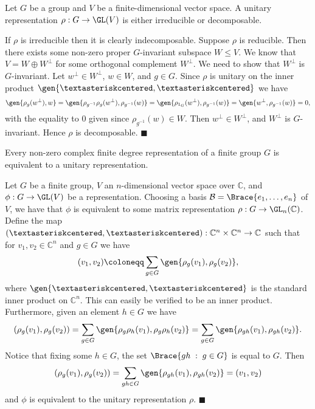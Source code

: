 \documentclass[../Project.tex]{subfiles}
\begin{document}
\begin{prop}[{\cite[Proposition 3.2.3]{1}}]
	Let $G$ be a group and $V$ be a finite-dimensional vector space. A unitary representation $\rho : G \to \GL(V)$ is either irreducible or decomposable.
	\label{unitaryiseither}
\end{prop}
\begin{proo*}[{\cite[Proposition 3.2.3]{1}}]
	If $\rho$ is irreducible then it is clearly indecomposable. Suppose $\rho$ is reducible. Then there exists some non-zero proper $G$-invariant subspace $W \leqslant V$. We know that $V = W \oplus W^\perp$ for some orthogonal complement $W^\perp$. We need to show that $W^\perp$ is $G$-invariant. Let $w^\perp \in W^\perp$, $w \in W$, and $g \in G$. Since $\rho$ is unitary on the inner product $\gen{\textasteriskcentered,\textasteriskcentered}$ we have
	$$\gen{\rho_g(w^\perp),w} = \gen{\rho_{g^{-1}}\rho_{g}(w^\perp),\rho_{g^{-1}}(w)} = \gen{\rho_{1_G}(w^\perp),\rho_{g^{-1}}(w)} = \gen{w^\perp,\rho_{g^{-1}}(w)} = 0,$$
	with the equality to $0$ given since $\rho_{g^{-1}}(w) \in W$. Then $w^\perp \in W^\perp$, and $W^{\perp}$ is $G$-invariant. Hence $\rho$ is decomposable. \hfill$\blacksquare$
\end{proo*}

\begin{prop}[{\cite[Proposition 3.2.4]{1}}]
	Every non-zero complex finite degree representation of a finite group $G$ is equivalent to a unitary representation.
	\label{unitaryeqtofinite}
\end{prop}
\begin{proo*}[{\cite[Proposition 3.2.4]{1}}]
	Let $G$ be a finite group, $V$ an $n$-dimensional vector space over $\mathbb{C}$, and $\phi : G \to \GL(V)$ be a representation. Choosing a basis $\mathcal{B} = \Brace{e_1,\dots,e_n}$ of $V$, we have that $\phi$ is equivalent to some matrix representation $\rho : G \to \GL_n(\mathbb{C})$. Define the map $(\textasteriskcentered,\textasteriskcentered) : \mathbb{C}^n \times \mathbb{C}^n \to \mathbb{C}$ such that for $v_1,v_2 \in \mathbb{C}^n$ and $g \in G$ we have
	$$(v_1,v_2) \coloneqq \sum_{g\in G}\gen{\rho_g(v_1),\rho_g(v_2)},$$
	where $\gen{\textasteriskcentered,\textasteriskcentered}$ is the standard inner product on $\mathbb{C}^n$. This can easily be verified to be an inner product. Furthermore, given an element $h \in G$ we have
	$$(\rho_g(v_1),\rho_g(v_2)) = \sum_{g \in G}\gen{\rho_g\rho_h(v_1),\rho_g\rho_h(v_2)} = \sum_{g \in G}\gen{\rho_{gh}(v_1),\rho_{gh}(v_2)}.$$
	Notice that fixing some $h \in G$, the set $\Brace{gh\;:\;g \in G}$ is equal to $G$. Then
	$$(\rho_g(v_1),\rho_g(v_2))  = \sum_{gh \in G}\gen{\rho_{gh}(v_1),\rho_{gh}(v_2)} = (v_1,v_2)$$
	and $\phi$ is equivalent to the unitary representation $\rho$. \hfill $\blacksquare$
\end{proo*}
\end{document}
